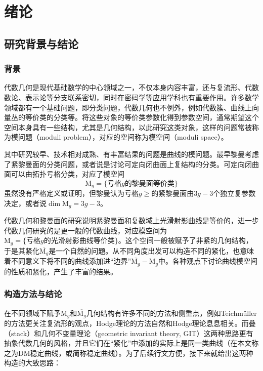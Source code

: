 \chapter{绪论}

\section{研究背景与结论}
\subsection{背景}
代数几何是现代基础数学的中心领域之一，不仅本身内容丰富，还与复流形、代数数论、表示论等分支联系密切，同时在密码学等应用学科也有重要作用。许多数学领域都有一个基础问题，即分类问题，代数几何也不例外，例如代数簇、曲线上向量丛的等价类的分类等。将这些对象的等价类参数化得到参数空间，通常期望这个空间本身具有一些结构，尤其是几何结构，以此研究这类对象，这样的问题常被称为模问题（moduli problem），对应的空间称为模空间（moduli space）。

其中研究较早、技术相对成熟、有丰富结果的问题是曲线的模问题。最早黎曼考虑了紧黎曼面的分类问题，或者说是讨论可定向闭曲面上复结构的分类。可定向闭曲面可以由拓扑亏格分类，对应了模空间$$ \mathrm{M}_g=\{\text{亏格}g\text{的黎曼面等价类}\} $$
虽然没有严格定义或证明，但黎曼认为亏格$ g\geqslant $的紧黎曼面由$ 3g-3 $个独立复参数决定，或者说$\dim \mathrm{M}_g= 3g-3 $。

代数几何和黎曼面的研究说明紧黎曼面和复数域上光滑射影曲线是等价的，进一步代数几何研究的是更一般的代数曲线，对应模空间为$ \mathrm{M}_g=\{\text{亏格}g\text{的光滑射影曲线等价类}\} $。这个空间一般被赋予了非紧的几何结构，于是其紧化$ \overline{\mathrm{M}_g} $是一个自然的问题。从不同角度出发可以构造不同的紧化，也意味着不同意义下将不同的曲线添加进“边界”$ \overline{\mathrm{M}_g}-\mathrm{M}_g $中。各种观点下讨论曲线模空间的性质和紧化，产生了丰富的结果。

\subsection{构造方法与结论}
在不同领域下赋予$ \mathrm{M}_g $和$ \overline{\mathrm{M}_g} $几何结构有许多不同的方法和侧重点，例如Teichm\"{u}ller的方法更关注复流形的观点，Hodge理论的方法自然和Hodge理论息息相关。而叠（stack）和几何不变量理论（geometric invariant theory, GIT）这两种思路更有抽象代数几何的风格，并且它们在“紧化”中添加的实际上是同一类曲线（在本文称之为DM稳定曲线，或简称稳定曲线）。为了后续行文方便，接下来就给出这两种构造的大致思路：

